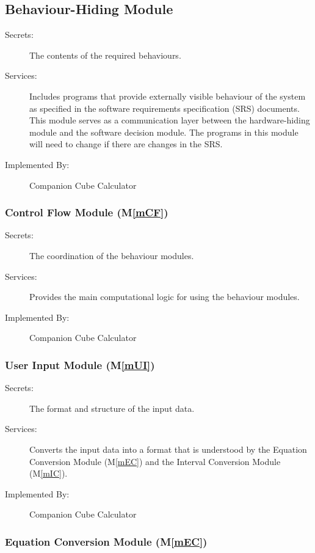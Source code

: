\documentclass[12pt, titlepage]{article}
\newcommand{\mref}[1]{M\ref{#1}}
\newcommand{\progname}{Companion Cube Calculator} %
\begin{document}
\subsection{Behaviour-Hiding Module}

\begin{description}
\item[Secrets:]The contents of the required behaviours.
\item[Services:]Includes programs that provide externally visible behaviour of
  the system as specified in the software requirements specification (SRS)
  documents. This module serves as a communication layer between the
  hardware-hiding module and the software decision module. The programs in this
  module will need to change if there are changes in the SRS.
\item[Implemented By:] \progname{}
\end{description}

\subsubsection{Control Flow Module (\mref{mCF})}

\begin{description}
	\item[Secrets:] The coordination of the behaviour modules.
	\item[Services:] Provides the main computational logic for using the 
	behaviour modules.
	\item[Implemented By:] \progname{}
\end{description}

\subsubsection{User Input Module (\mref{mUI})}

\begin{description}
\item[Secrets:] The format and structure of the input data.
\item[Services:] Converts the input data into a format that is understood by 
the Equation Conversion Module (\mref{mEC}) and the Interval Conversion Module 
(\mref{mIC}).
\item[Implemented By:] \progname{}
\end{description}

\subsubsection{Equation Conversion Module (\mref{mEC})}
\end{document}
